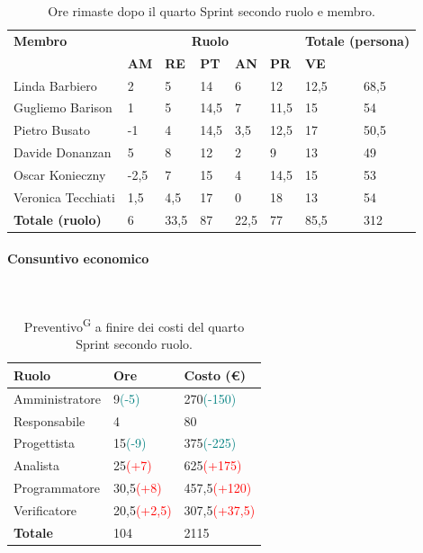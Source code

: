 \documentclass[8pt]{article}
\newcommand{\glossterm}[1]{#1\textsuperscript{G}} %
\newcommand{\subsubsubsection}[1]{\paragraph{#1}\mbox{}\\}
\begin{document}
\begin{table}[ht!]
	\centering
	\begin{tabular}{p{3cm} p{1.4cm} p{1.6cm} p{1.5cm} p{1.5cm} p{1.5cm} p{1.5cm} p{2cm}}
		\toprule
        \textbf{Membro} & \multicolumn{5}{c}{\textbf{Ruolo}} & \multicolumn{2}{r}{\textbf{Totale (persona)}}\\
		& \textbf{AM} & \textbf{RE} & \textbf{PT} & \textbf{AN} & \textbf{PR} & \textbf{VE}\\
		\midrule
        Linda Barbiero     & 2 & 5 & 14 & 6 & 12 & 12,5 & 68,5 \\
        Gugliemo Barison   & 1 & 5 & 14,5 & 7 & 11,5 & 15 & 54 \\
        Pietro Busato      & -1& 4 & 14,5 & 3,5 & 12,5 & 17 & 50,5 \\
        Davide Donanzan    & 5 & 8 & 12 & 2 & 9 & 13 & 49 \\
        Oscar Konieczny    & -2,5 & 7 & 15 & 4 & 14,5 & 15 & 53 \\
        Veronica Tecchiati & 1,5 & 4,5 & 17 & 0 & 18 & 13 & 54 \\
        \midrule
        \textbf{Totale (ruolo)} & 6 & 33,5 & 87 & 22,5 & 77 & 85,5 & 312 \\
		\bottomrule
	\end{tabular}
	\caption{Ore rimaste dopo il quarto Sprint secondo ruolo e membro.}
	\label{table:Ore rimaste dopo il terzo Sprint secondo ruolo e membro.}
\end{table}
\subsubsubsection{Consuntivo economico}
\begin{table}[ht!]
    \centering
    \begin{tabular}{p{4cm} p{1.8cm} p{2.2cm}}
        \toprule
        \textbf{Ruolo} & \textbf{Ore} & \textbf{Costo (€)} \\
        \midrule
        Amministratore & 9\textcolor{teal}{(-5)} & 270\textcolor{teal}{(-150)} \\
        Responsabile & 4  & 80 \\
        Progettista & 15\textcolor{teal}{(-9)}  & 375\textcolor{teal}{(-225)} \\
        Analista & 25\textcolor{red}{(+7)} & 625\textcolor{red}{(+175)} \\
        Programmatore & 30,5\textcolor{red}{(+8)} & 457,5\textcolor{red}{(+120)} \\
        Verificatore & 20,5\textcolor{red}{(+2,5)} & 307,5\textcolor{red}{(+37,5)} \\
        \bottomrule
        \textbf{Totale} & 104 & 2115
    \end{tabular}
    \caption{\glossterm{Preventivo} a finire dei costi del quarto Sprint secondo ruolo.}
    \label{table:Preventivo a finire dei costi del terzo Sprint secondo ruolo}
\end{table}
\end{document}
